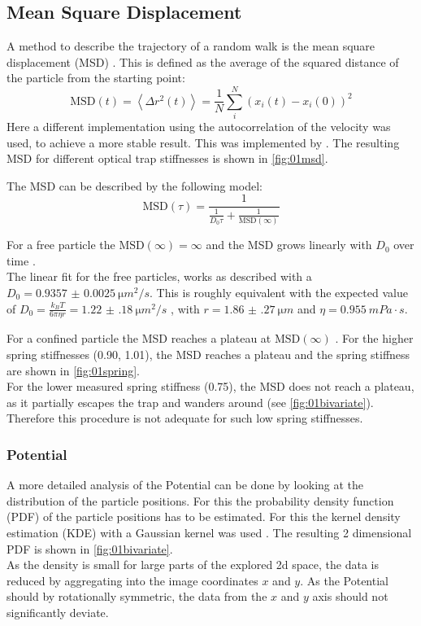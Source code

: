 \documentclass[
    parskip=half, 
    twoside=false,
    twocolumn=true,
    fontsize=11pt,
]{scrarticle}
\begin{document}
\subsection*{Mean Square Displacement}
A method to describe the trajectory of a random walk is the mean square displacement (MSD) \cite{wiki:msd}.
This is defined as the average of the squared distance of the particle from the starting point:
\begin{equation}
    \text{MSD}(t) = \left<\Delta r^2(t)\right> = \frac{1}{N} \sum_i^N \left(x_i(t) - x_i(0) \right)^2 
\end{equation}
Here a different implementation using the autocorrelation of the velocity was used, to achieve a more stable result.
This was implemented by \cite{jl:msd}.
The resulting MSD for different optical trap stiffnesses is shown in \autoref{fig:01msd}.

The MSD can be described by the following model:
\begin{equation}
    \text{MSD}(\tau) = \frac{1}{\frac{1}{D_0 \tau} + \frac{1}{\text{MSD}(\infty)}}
    \label{eq:01_mdl_msd} 
\end{equation}

For a free particle the $\text{MSD}(\infty)=\infty$ and the MSD grows linearly with $D_0$ over time \cite{wiki:msd,instructions}.\\
The linear fit for the free particles, works as described with a $D_0 = \SI{0.9357(25)}{\micro m^2/s}$.
This is roughly equivalent with the expected value of $D_0 = \frac{k_B T}{6 \pi \eta r} = \SI{1.22(18)}{\micro m ^2 / s}$ \cite{instructions}, with $r = \SI{1.86(27)}{\micro m}$ and $\eta = \SI{0.955}{mPa\cdot s}$.

For a confined particle the MSD reaches a plateau at $\text{MSD}(\infty)$ \cite{instructions}.
For the higher spring stiffnesses (\SI{0.90}{}, \SI{1.01}{}), the MSD reaches a plateau and the spring stiffness are shown in \autoref{fig:01spring}.\\
For the lower measured spring stiffness (\SI{0.75}{}), the MSD does not reach a plateau, as it partially escapes the trap and wanders around (see \autoref{fig:01bivariate}).
Therefore this procedure is not adequate for such low spring stiffnesses.

\subsubsection*{Potential}
A more detailed analysis of the Potential can be done by looking at the distribution of the particle positions.
For this the probability density function (PDF) of the particle positions has to be estimated.
For this the kernel density estimation (KDE) with a Gaussian kernel was used \cite{jl:kde}.
The resulting 2 dimensional PDF is shown in \autoref{fig:01bivariate}.\\
As the density is small for large parts of the explored 2d space, the data is reduced by aggregating into the image coordinates $x$ and $y$.
As the Potential should by rotationally symmetric, the data from the $x$ and $y$ axis should not significantly deviate.
\end{document}
